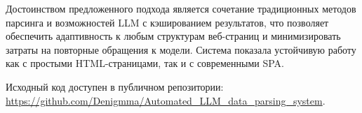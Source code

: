 Достоинством предложенного подхода является сочетание традиционных методов парсинга и возможностей LLM с кэшированием результатов, что позволяет обеспечить адаптивность к любым структурам веб-страниц и минимизировать затраты на повторные обращения к модели. Система показала устойчивую работу как с простыми HTML-страницами, так и с современными SPA.

Исходный код доступен в публичном репозитории:
\href{https://github.com/Denigmma/Automated_LLM_data_parsing_system}{https://github.com/Denigmma/Automated\_LLM\_data\_parsing\_system}.
